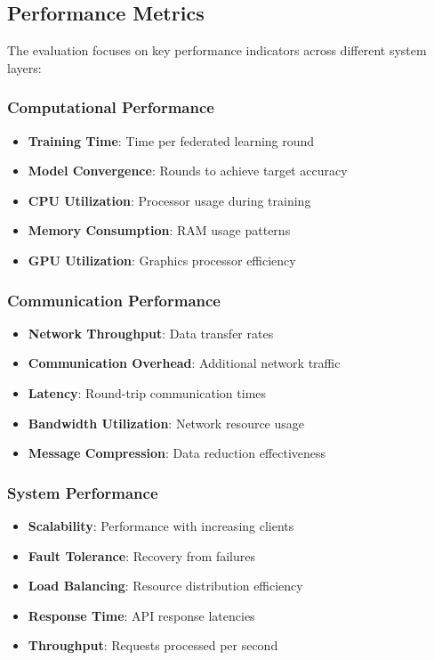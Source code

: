 \subsection{Performance Metrics}

The evaluation focuses on key performance indicators across different system layers:

\subsubsection{Computational Performance}
\begin{itemize}
    \item \textbf{Training Time}: Time per federated learning round
    \item \textbf{Model Convergence}: Rounds to achieve target accuracy
    \item \textbf{CPU Utilization}: Processor usage during training
    \item \textbf{Memory Consumption}: RAM usage patterns
    \item \textbf{GPU Utilization}: Graphics processor efficiency
\end{itemize}

\subsubsection{Communication Performance}
\begin{itemize}
    \item \textbf{Network Throughput}: Data transfer rates
    \item \textbf{Communication Overhead}: Additional network traffic
    \item \textbf{Latency}: Round-trip communication times
    \item \textbf{Bandwidth Utilization}: Network resource usage
    \item \textbf{Message Compression}: Data reduction effectiveness
\end{itemize}

\subsubsection{System Performance}
\begin{itemize}
    \item \textbf{Scalability}: Performance with increasing clients
    \item \textbf{Fault Tolerance}: Recovery from failures
    \item \textbf{Load Balancing}: Resource distribution efficiency
    \item \textbf{Response Time}: API response latencies
    \item \textbf{Throughput}: Requests processed per second
\end{itemize}

